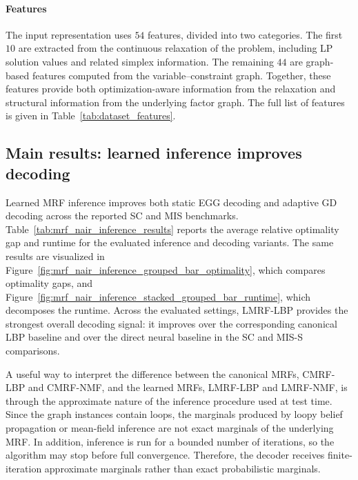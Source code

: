

\paragraph{Features}
The input representation uses $54$ features, divided into two categories. The first $10$ are extracted from the continuous relaxation of the problem, including LP solution values and related simplex information. The remaining $44$ are graph-based features computed from the variable--constraint graph. Together, these features provide both optimization-aware information from the relaxation and structural information from the underlying factor graph. The full list of features is given in Table~\ref{tab:dataset_features}.



\subsection{Main results: learned inference improves decoding}
\label{subsec:chapter_3_main_results}

Learned MRF inference improves both static EGG decoding and adaptive GD decoding across the reported SC and MIS benchmarks. Table~\ref{tab:mrf_nair_inference_results} reports the average relative optimality gap and runtime for the evaluated inference and decoding variants. The same results are visualized in Figure~\ref{fig:mrf_nair_inference_grouped_bar_optimality}, which compares optimality gaps, and Figure~\ref{fig:mrf_nair_inference_stacked_grouped_bar_runtime}, which decomposes the runtime. Across the evaluated settings, LMRF-LBP provides the strongest overall decoding signal: it improves over the corresponding canonical LBP baseline and over the direct neural baseline in the SC and MIS-S comparisons.

A useful way to interpret the difference between the canonical MRFs, CMRF-LBP and CMRF-NMF, and the learned MRFs, LMRF-LBP and LMRF-NMF, is through the approximate nature of the inference procedure used at test time. Since the graph instances contain loops, the marginals produced by loopy belief propagation or mean-field inference are not exact marginals of the underlying MRF. In addition, inference is run for a bounded number of iterations, so the algorithm may stop before full convergence. Therefore, the decoder receives finite-iteration approximate marginals rather than exact probabilistic marginals.

